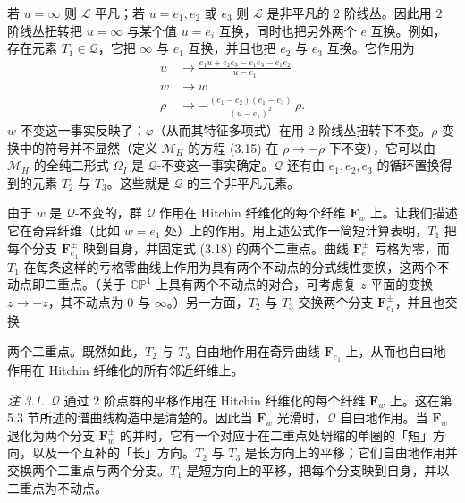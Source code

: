 若 $u=\infty$ 则 $\mathcal{L}$ 平凡；若 $u=e_1,e_2$ 或 $e_3$ 则 $\mathcal{L}$ 是非平凡的 $2$ 阶线丛。因此用 $2$ 阶线丛扭转把 $u=\infty$ 与某个值 $u=e_i$ 互换，同时也把另外两个 $e$ 互换。例如，存在元素 $T_1\in\mathcal{Q}$，它把 $\infty$ 与 $e_1$ 互换，并且也把 $e_2$ 与 $e_3$ 互换。它作用为
\begin{equation}\tag{3.19}
\begin{aligned}
u &\to \frac{e_1u+e_2e_3-e_1e_3-e_1e_2}{u-e_1}\\
w &\to w\\
\rho &\to -\frac{(e_1-e_2)(e_1-e_3)}{(u-e_1)^2}\,\rho.
\end{aligned}
\end{equation}
$w$ 不变这一事实反映了：$\varphi$（从而其特征多项式）在用 $2$ 阶线丛扭转下不变。$\rho$ 变换中的符号并不显然（定义 $\mathcal{M}_H$ 的方程 (3.15) 在 $\rho\to-\rho$ 下不变），它可以由 $\mathcal{M}_H$ 的全纯二形式 $\Omega_I$ 是 $\mathcal{Q}$-不变这一事实确定。$\mathcal{Q}$ 还有由 $e_1,e_2,e_3$ 的循环置换得到的元素 $T_2$ 与 $T_3$。这些就是 $\mathcal{Q}$ 的三个非平凡元素。

由于 $w$ 是 $\mathcal{Q}$-不变的，群 $\mathcal{Q}$ 作用在 Hitchin 纤维化的每个纤维 $\boldsymbol{F}_w$ 上。让我们描述它在奇异纤维（比如 $w=e_1$ 处）上的作用。用上述公式作一简短计算表明，$T_1$ 把每个分支 $\boldsymbol{F}_{e_1}^{\pm}$ 映到自身，并固定式 (3.18) 的两个二重点。曲线 $\boldsymbol{F}_{e_1}^{\pm}$ 亏格为零，而 $T_1$ 在每条这样的亏格零曲线上作用为具有两个不动点的分式线性变换，这两个不动点即二重点。（关于 $\mathbb{C}\mathbb{P}^1$ 上具有两个不动点的对合，可考虑复 $z$-平面的变换 $z\to -z$，其不动点为 $0$ 与 $\infty$。）另一方面，$T_2$ 与 $T_3$ 交换两个分支 $\boldsymbol{F}_{e_1}^{\pm}$，并且也交换


两个二重点。既然如此，$T_2$ 与 $T_3$ 自由地作用在奇异曲线 $\boldsymbol{F}_{e_1}$ 上，从而也自由地作用在 Hitchin 纤维化的所有邻近纤维上。

\bigskip
\noindent\textit{注 3.1.}\ $\mathcal{Q}$ 通过 $2$ 阶点群的平移作用在 Hitchin 纤维化的每个纤维 $\boldsymbol{F}_w$ 上。这在第 5.3 节所述的谱曲线构造中是清楚的。因此当 $\boldsymbol{F}_w$ 光滑时，$\mathcal{Q}$ 自由地作用。当 $\boldsymbol{F}_w$ 退化为两个分支 $\boldsymbol{F}_w^{\pm}$ 的并时，它有一个对应于在二重点处坍缩的单圈的「短」方向，以及一个互补的「长」方向。$T_2$ 与 $T_3$ 是长方向上的平移；它们自由地作用并交换两个二重点与两个分支。$T_1$ 是短方向上的平移，把每个分支映到自身，并以二重点为不动点。
